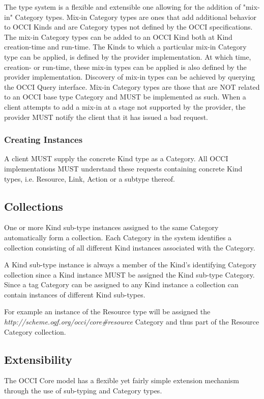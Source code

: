 \documentclass[10pt,a4paper]{article}
\begin{document}
The type system is a flexible and extensible one allowing for the addition of "mix-in" Category types. Mix-in Category types are ones that add additional behavior to OCCI Kinds and are Category types not defined by the OCCI specifications. The mix-in Category types can be added to an OCCI Kind both at Kind creation-time and run-time. The Kinds to which a particular mix-in Category type can be applied, is defined by the provider implementation. At which time, creation- or run-time, these mix-in types can be applied is also defined by the provider implementation. Discovery of mix-in types can be achieved by querying the OCCI Query interface. Mix-in Category types are those that are NOT related to an OCCI base type Category and MUST be implemented as such. When a client attempts to add a mix-in at a stage not supported by the provider, the provider MUST notify the client that it has issued a bad request.

\subsubsection{Creating Instances}
A client MUST supply the concrete Kind type as a Category. All OCCI implementations MUST understand these requests containing concrete Kind types, i.e. Resource, Link, Action or a subtype thereof.

\subsection{Collections}
\label{sec:collection}

One or more Kind sub-type instances assigned to the same Category automatically
form a collection. Each Category in the system identifies a collection
consisting of all different Kind instances associated with the Category.

A Kind sub-type instance is always a member of the Kind's identifying Category
collection since a Kind instance MUST be assigned the Kind sub-type Category.
Since a tag Category can be assigned to any Kind instance a collection can
contain instances of different Kind sub-types.

For example an instance of the Resource type will be assigned the
\textit{http://scheme.ogf.org/occi/core\#resource} Category and thus part of the
Resource Category collection.


\subsection{Extensibility}
The OCCI Core model has a flexible yet fairly simple extension mechanism through the use of sub-typing and Category types. 
\end{document}
